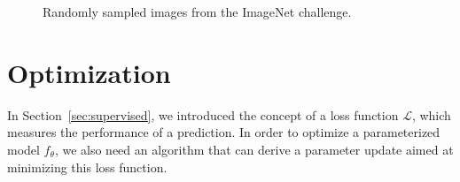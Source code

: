\begin{figure}[H]
{	}
	\caption{Randomly sampled images from the ImageNet challenge.}
	\label{fig:lscrv}
\end{figure}
\section{Optimization}
\label{sec:optimization}
In Section~\ref{sec:supervised}, we introduced the concept of a loss function $\mathcal{L}$, which measures the performance of a prediction. In order to optimize a parameterized model $f_\theta$, we also need an algorithm that can derive a parameter update aimed at minimizing this loss function.

